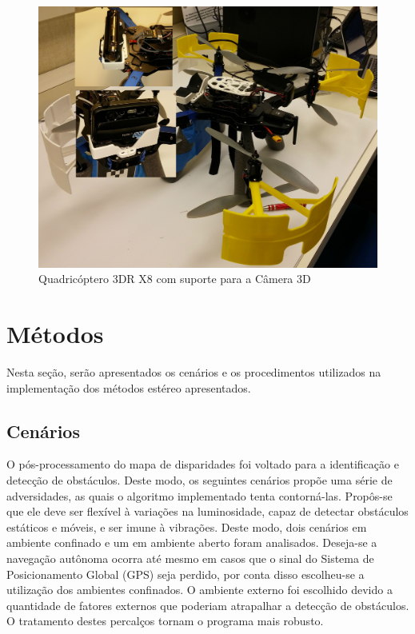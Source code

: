 \begin{figure}[H]
	\centering
	\includegraphics[scale=0.10]{./Resources/quad_camera_support.jpg}
	\caption{Quadricóptero 3DR X8 com suporte para a Câmera 3D}
	\label{quad_camera_support}
\end{figure}


\section{Métodos}

Nesta seção, serão apresentados os cenários e os procedimentos utilizados na implementação dos métodos estéreo apresentados.


\subsection{Cenários}

O pós-processamento do mapa de disparidades foi voltado para a identificação e detecção de obstáculos. Deste modo, os seguintes cenários propõe uma série de adversidades, as quais o algoritmo implementado tenta contorná-las. Propôs-se que ele deve ser flexível à variações na luminosidade, capaz de detectar obstáculos estáticos e móveis, e ser imune à vibrações. Deste modo, dois cenários em ambiente confinado e um em ambiente aberto foram analisados. Deseja-se a navegação autônoma ocorra até mesmo em casos que o sinal do Sistema de Posicionamento Global (GPS) seja perdido, por conta disso escolheu-se a utilização dos ambientes confinados. O ambiente externo foi escolhido devido a quantidade de fatores externos que poderiam atrapalhar a detecção de obstáculos. O tratamento destes percalços tornam o programa mais robusto.


